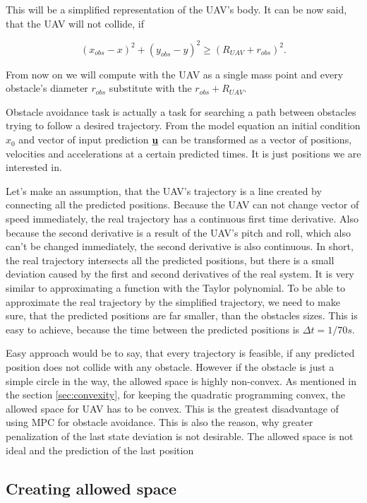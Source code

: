 \documentclass[a4paper,11pt,titlepage]{article}
\newcommand{\uvec}{\textbf{\underline{u}}}
\begin{document}
This will be a simplified representation of the UAV's body. It can be now said, that the UAV will not collide, if 

\begin{equation}
(x_{obs} - x)^2 + (y_{obs} - y)^2 \geq (R_{UAV} + r_{obs})^2.
\end{equation}

From now on we will compute with the UAV as a single mass point and every obstacle's diameter $r_{obs}$ substitute with the $r_{obs} + R_{UAV}$.	

Obstacle avoidance task is actually a task for searching a path between obstacles trying to follow a desired trajectory. From the model equation an initial condition $x_0$ and vector of input prediction $\uvec$ can be transformed as a vector of positions, velocities and accelerations at a certain predicted times. It is just positions we are interested in. 

Let's make an assumption, that the UAV's trajectory is a line created by connecting all the predicted positions. Because the UAV can not change vector of speed immediately, the real trajectory has a continuous first time derivative. Also because the second derivative is a result of the UAV's pitch and roll, which also can't be changed immediately, the second derivative is also continuous. In short, the real trajectory intersects all the predicted positions, but there is a small deviation caused by the first and second derivatives of the real system. It is very similar to approximating a function with the Taylor polynomial. To be able to approximate the real trajectory by the simplified trajectory, we need to make sure, that the predicted positions are far smaller, than the obstacles sizes. This is easy to achieve, because the time between the predicted positions is $\Delta t = 1/70s$.

Easy approach would be to say, that every trajectory is feasible, if any predicted position does not collide with any obstacle. However if the obstacle is just a simple circle in the way, the allowed space is highly non-convex. As mentioned in the section \ref{sec:convexity}, for keeping the quadratic programming convex, the allowed space for UAV has to be convex. This is the greatest disadvantage of using MPC for obstacle avoidance. This is also the reason, why greater penalization of the last state deviation is not desirable. The allowed space is not ideal and the prediction of the last position 

\subsection{Creating allowed space}
\end{document}
